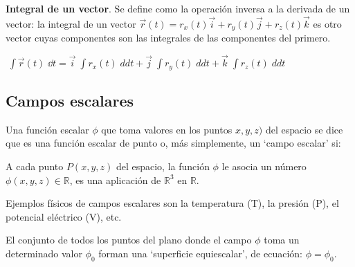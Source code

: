 \vspace{4mm} \textbf{Integral de un vector}. Se define como la operación inversa a la derivada de un vector: la integral de un vector $\vec r(t)=r_x(t) \vec i + r_y(t) \vec j + r_z(t) \vec k$ es otro vector cuyas componentes son las integrales de las componentes del primero.

\hspace{20mm} $\boxed{ \; \displaystyle \int \vec r (t)\; \dd t = \vec i \; \int r_x (t)\; dd t + \vec j \; \int r_y (t)\; dd t+ \vec k \; \int r_z (t)\; dd t \; }$

\subsection{Campos escalares}

Una función escalar $\phi$ que toma valores en los puntos $x,y,z)$ del espacio se dice que es una función escalar de punto o, más simplemente, un `campo escalar' si:

A cada punto $P(x,y,z)$ del espacio, la función $\phi$ le asocia un número $\phi (x,y,z)\in \mathbb R$, es una aplicación de $\mathbb R^3$ en $\mathbb R$.

Ejemplos físicos de campos escalares son la temperatura (T), la presión (P), el potencial eléctrico (V), etc. 

El conjunto de todos los puntos del plano donde el campo $\phi$ toma un determinado valor $\phi_0$ forman una `superficie equiescalar', de ecuación: $\phi=\phi_0$.


